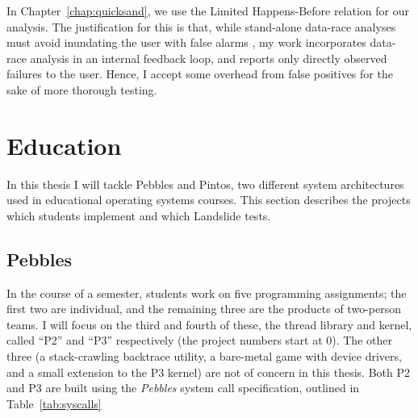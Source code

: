 
In Chapter~\ref{chap:quicksand}, we use the Limited Happens-Before relation for our analysis.
The justification for this is that, while stand-alone data-race analyses must avoid inundating the user with false alarms \cite{racerx},
my work incorporates data-race analysis in an internal feedback loop, and reports only directly observed failures to the user.
Hence, I accept some overhead from false positives for the sake of more thorough testing.


\section{Education}
\label{sec:overview-edu}

In this thesis I will tackle Pebbles and Pintos, two different system architectures used in educational operating systems courses.
This section describes the projects which students implement and which Landslide tests.

\subsection{Pebbles}

In the course of a semester, students work on five programming assignments;
the first two are individual, and the remaining three are the products of two-person teams.
I will focus on the third and fourth of these, the thread library and kernel,
called ``P2'' and ``P3'' respectively (the project numbers start at 0).
The other three (a stack-crawling backtrace utility, a bare-metal game with device drivers, and a small extension to the P3 kernel) are not of concern in this thesis.
Both P2 and P3 are built using the {\em Pebbles} system call specification, outlined in Table~\ref{tab:syscalls}


